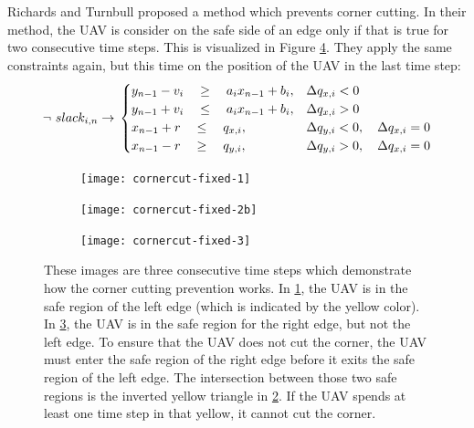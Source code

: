 Richards and Turnbull\cite{Richards2015} proposed a method which prevents corner cutting. In their method, the UAV is consider on the safe side of an edge only if that is true for two consecutive time steps.  This is visualized in Figure \ref{fig:cc-fixed}. They apply the same constraints again, but this time on the position of the UAV in the last time step:
\begin{equation}
\label{eq:corner-skip-fixed}
\neg ~ slack_{i,n} \rightarrow \\
\begin{cases}
y_{n-1} -  v_i \quad \geq 
\quad a_{i} x_{n-1} + b_{i},  	
& \Delta q_{x,i} < 0 							 	
 \\
y_{n-1} + v_i \quad \leq 
\quad a_{i} x_{n-1} + b_{i},
& \Delta q_{x,i} > 0 							 	
 \\
x_{n-1} + r \quad \leq
\quad  q_{x,i}, 		
& \Delta q_{y,i} < 0, \quad \Delta q_{x,i} = 0 	
 \\
x_{n-1} - r \quad \geq 
\quad q_{y,i},  		
& \Delta q_{y,i} > 0, \quad \Delta q_{x,i} = 0 	
\end{cases}
\end{equation}
\begin{figure}
	\centering
	\begin{subfigure}[t]{0.3\columnwidth}
        		\texttt{[image: cornercut-fixed-1]}
        		\caption{}
        		\label{fig:cc-fixed-1}
	\end{subfigure}
	\hfil
	\begin{subfigure}[t]{0.3\columnwidth}
        		\texttt{[image: cornercut-fixed-2b]}
        		\caption{}
        		 \label{fig:cc-fixed-2}
	\end{subfigure}	
		\hfil
	\begin{subfigure}[t]{0.3\columnwidth}
        		\texttt{[image: cornercut-fixed-3]}
        		\caption{}
        		\label{fig:cc-fixed-3}
	\end{subfigure}
    \caption{These images are three consecutive time steps which demonstrate how the corner cutting prevention works. In \ref{fig:cc-fixed-1}, the UAV is in the safe region of the left edge (which is indicated by the yellow color). In \ref{fig:cc-fixed-3}, the UAV is in the safe region for the right edge, but not the left edge. To ensure that the UAV does not cut the corner, the UAV must enter the safe region of the right edge before it exits the safe region of the left edge. The intersection between those two safe regions is the inverted yellow triangle in \ref{fig:cc-fixed-2}. If the UAV spends at least one time step in that yellow, it cannot cut the corner.}
    \label{fig:cc-fixed}     
\end{figure}

